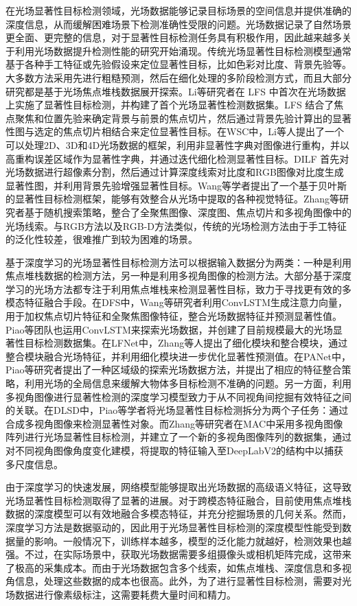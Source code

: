 在光场显著性目标检测领域，光场数据能够记录目标场景的空间信息并提供准确的深度信息，从而缓解困难场景下检测准确性受限的问题。光场数据记录了自然场景更全面、更完整的信息，对于显著性目标检测任务具有积极作用，因此越来越多关于利用光场数据提升检测性能的研究开始涌现。传统光场显著性目标检测模型通常基于各种手工特征或先验假设来定位显著性目标，比如色彩对比度、背景先验等。大多数方法采用先进行粗糙预测，然后在细化处理的多阶段检测方式，而且大部分研究都是基于光场焦点堆栈数据展开探索。Li等研究者在 LFS 中首次在光场数据上实施了显著性目标检测，并构建了首个光场显著性检测数据集。LFS 结合了焦点聚焦和位置先验来确定背景与前景的焦点切片，然后通过背景先验计算出的显著性图与选定的焦点切片相结合来定位显著性目标。在WSC中，Li等人提出了一个可以处理2D、3D和4D光场数据的框架，利用非显著性字典对图像进行重构，并以高重构误差区域作为显著性字典，并通过迭代细化检测显著性目标。DILF 首先对光场数据进行超像素分割，然后通过计算深度线索对比度和RGB图像对比度生成显著性图，并利用背景先验增强显著性目标。Wang等学者提出了一个基于贝叶斯的显著性目标检测框架，能够有效整合从光场中提取的各种视觉特征。Zhang等研究者基于随机搜索策略，整合了全聚焦图像、深度图、焦点切片和多视角图像中的光场线索。与RGB方法以及RGB-D方法类似，传统的光场检测方法由于手工特征的泛化性较差，很难推广到较为困难的场景。



基于深度学习的光场显著性目标检测方法可以根据输入数据分为两类：一种是利用焦点堆栈数据的检测方法，另一种是利用多视角图像的检测方法。大部分基于深度学习的光场方法都专注于利用焦点堆栈来检测显著性目标，致力于寻找更有效的多模态特征融合手段。在DFS中，Wang等研究者利用ConvLSTM生成注意力向量，用于加权焦点切片特征和全聚焦图像特征，整合光场数据特征并预测显著性值。Piao等团队也运用ConvLSTM来探索光场数据，并创建了目前规模最大的光场显著性目标检测数据集。在LFNet中，Zhang等人提出了细化模块和整合模块，通过整合模块融合光场特征，并利用细化模块进一步优化显著性预测值。在PANet中，Piao等研究者提出了一种区域级的探索光场数据方法，并提出了相应的特征整合策略，利用光场的全局信息来缓解大物体多目标检测不准确的问题。另一方面，利用多视角图像进行显著性检测的深度学习模型致力于从不同视角间挖掘有效特征之间的关联。在DLSD中，Piao等学者将光场显著性目标检测拆分为两个子任务：通过合成多视角图像来检测显著性对象。而Zhang等研究者在MAC中采用多视角图像阵列进行光场显著性目标检测，并建立了一个新的多视角图像阵列的数据集，通过对不同视角图像角度变化建模，将提取的特征输入至DeepLabV2的结构中以捕获多尺度信息。



由于深度学习的快速发展，网络模型能够提取出光场数据的高级语义特征，这导致光场显著性目标检测取得了显著的进展。对于跨模态特征融合，目前使用焦点堆栈数据的深度模型可以有效地融合多模态特征，并充分挖掘场景的几何关系。然而，深度学习方法是数据驱动的，因此用于光场显著性目标检测的深度模型性能受到数据量的影响。一般情况下，训练样本越多，模型的泛化能力就越好，检测效果也越强。不过，在实际场景中，获取光场数据需要多组摄像头或相机矩阵完成，这带来了极高的采集成本。而由于光场数据包含多个线索，如焦点堆栈、深度信息和多视角信息，处理这些数据的成本也很高。此外，为了进行显著性目标检测，需要对光场数据进行像素级标注，这需要耗费大量时间和精力。

